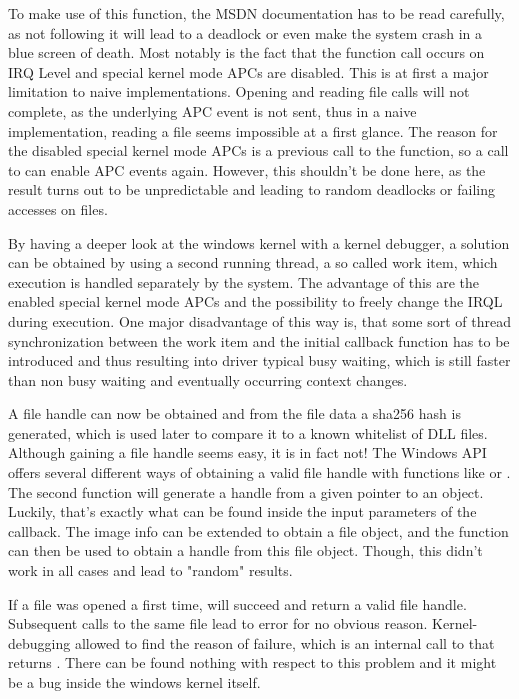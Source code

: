 To make use of this function, the MSDN documentation has to be read carefully, as not following it will lead to a deadlock or even make the system crash in a blue screen of death. Most notably is the fact that the function call occurs on IRQ Level  and special kernel mode APCs are disabled. This is at first a major limitation to naive implementations. Opening and reading file calls will not complete, as the underlying APC event is not sent, thus in a naive implementation, reading a file seems impossible at a first glance. The reason for the disabled special kernel mode APCs is a previous call to the  function, so a call to  can enable APC events again. However, this shouldn't be done here, as the result turns out to be unpredictable and leading to random deadlocks or failing accesses on files.

By having a deeper look at the windows kernel with a kernel debugger, a solution can be obtained by using a second running thread, a so called work item, which execution is handled separately by the system. The advantage of this are the enabled special kernel mode APCs and the possibility to freely change the IRQL during execution. One major disadvantage of this way is, that some sort of thread synchronization between the work item and the initial callback function has to be introduced and thus resulting into driver typical busy waiting, which is still faster than non busy waiting and eventually occurring context changes. 

A file handle can now be obtained and from the file data a sha256 hash is generated, which is used later to compare it to a known whitelist of DLL files. Although gaining a file handle seems easy, it is in fact not! The Windows API offers several different ways of obtaining a valid file handle with functions like  or . The second function  will generate a handle from a given pointer to an object. Luckily, that's exactly what can be found inside the input parameters of the  callback. The image info can be extended to obtain a file object, and the  function can then be used to obtain a handle from this file object. Though, this didn't work in all cases and lead to "random" results. 

If a file was opened a first time,  will succeed and return a valid file handle. Subsequent calls to the same file lead to error  for no obvious reason. Kernel-debugging allowed to find the reason of failure, which is an internal call to  that returns . There can be found nothing with respect to this problem and it might be a bug inside the windows kernel itself. 

